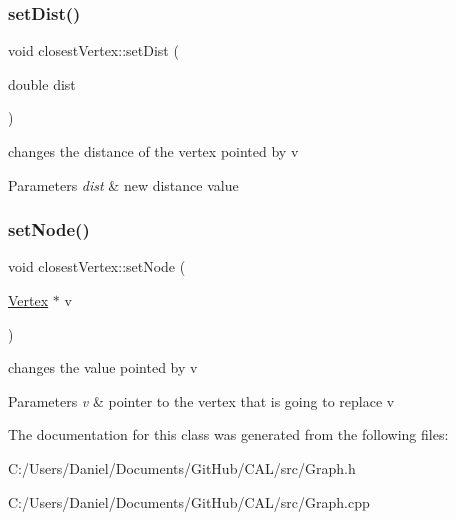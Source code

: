 \subsubsection{\texorpdfstring{set\+Dist()}{setDist()}}
{\footnotesize\ttfamily void closest\+Vertex\+::set\+Dist (\begin{DoxyParamCaption}\item[{double}]{dist }\end{DoxyParamCaption})}



changes the distance of the vertex pointed by v 


\begin{DoxyParams}{Parameters}
{\em dist} & new distance value \\
\hline
\end{DoxyParams}
\hypertarget{classclosest_vertex_a899b2479d95304851a4749e008b21065}{}\label{classclosest_vertex_a899b2479d95304851a4749e008b21065} 
\subsubsection{\texorpdfstring{set\+Node()}{setNode()}}
{\footnotesize\ttfamily void closest\+Vertex\+::set\+Node (\begin{DoxyParamCaption}\item[{\hyperlink{class_vertex}{Vertex} $\ast$}]{v }\end{DoxyParamCaption})}



changes the value pointed by v 


\begin{DoxyParams}{Parameters}
{\em v} & pointer to the vertex that is going to replace v \\
\hline
\end{DoxyParams}


The documentation for this class was generated from the following files\+:\begin{DoxyCompactItemize}
\item 
C\+:/\+Users/\+Daniel/\+Documents/\+Git\+Hub/\+C\+A\+L/src/Graph.\+h\item 
C\+:/\+Users/\+Daniel/\+Documents/\+Git\+Hub/\+C\+A\+L/src/Graph.\+cpp\end{DoxyCompactItemize}
